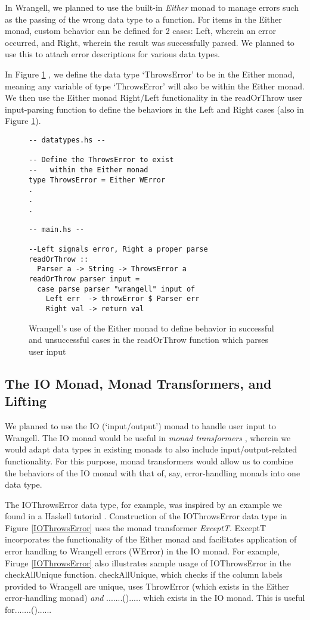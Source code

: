 \documentclass[preprint,nocopyrightspace]{sig-alternate}
\begin{document}
In Wrangell, we planned to use the built-in \emph{Either} monad to manage errors such as the passing of the wrong data type to a function. For items in the Either monad, custom behavior can be defined for 2 cases: Left, wherein an error occurred, and Right, wherein the result was successfully parsed. We planned to use this to attach error descriptions for various data types.  

In Figure \ref{eitherThrowError0} , we define the data type `ThrowsError' to be in the Either monad, meaning any variable of type `ThrowsError' will also be within the Either monad. We then use the Either monad Right/Left functionality in the readOrThrow user input-parsing function to define the behaviors in the Left and Right cases (also in Figure \ref{eitherThrowError0}).

\begin{figure}
\begin{lstlisting}
-- datatypes.hs --

-- Define the ThrowsError to exist 
--   within the Either monad
type ThrowsError = Either WError
.
.
.

-- main.hs --

--Left signals error, Right a proper parse
readOrThrow :: 
  Parser a -> String -> ThrowsError a
readOrThrow parser input = 
  case parse parser "wrangell" input of
    Left err  -> throwError $ Parser err
    Right val -> return val 

\end{lstlisting}
\caption{Wrangell's use of the Either monad to define behavior in successful and unsuccessful cases in the readOrThrow function which parses user input}
\label{eitherThrowError0}
\end{figure}

\subsection{The IO Monad, Monad Transformers, and Lifting}
We planned to use the IO (`input/output') monad to handle user input to Wrangell. The IO monad would be useful in \emph{monad transformers} \cite{monadTransform}, wherein we would adapt data types in existing monads to also include input/output-related functionality. For this purpose, monad transformers would allow us to combine the behaviors of the IO monad with that of, say, error-handling monads into one data type. 

The IOThrowsError data type, for example, was inspired by an example we found in a Haskell tutorial \cite{writeScheme48}. Construction of the IOThrowsError data type in Figure \ref{IOThrowsError} uses the monad transformer \emph{ExceptT}. ExceptT incorporates the functionality of the Either monad and facilitates application of error handling to Wrangell errors (WError) in the IO monad. For example, Firuge \ref{IOThrowsError} also illustrates sample usage of IOThrowsError in the checkAllUnique function. checkAllUnique, which checks if the column labels provided to Wrangell are unique, uses ThrowError (which exists in the Either error-handling monad) \emph{and} .......()..... which exists in the IO monad. This is useful for.......()......
\end{document}
